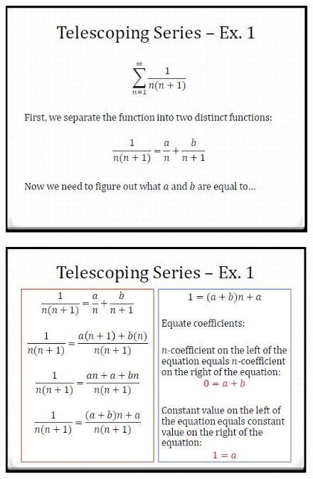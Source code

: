 \documentclass{beamer}
\begin{document}
\begin{frame}
	\begin{figure}
		\centering
		\includegraphics[width=0.99\linewidth]{SeqSer22E}
	\end{figure}
	
\end{frame}	
\begin{frame}
	\begin{figure}
		\centering
		\includegraphics[width=0.99\linewidth]{SeqSer22F}
	\end{figure}
	
\end{frame}
\end{document}
